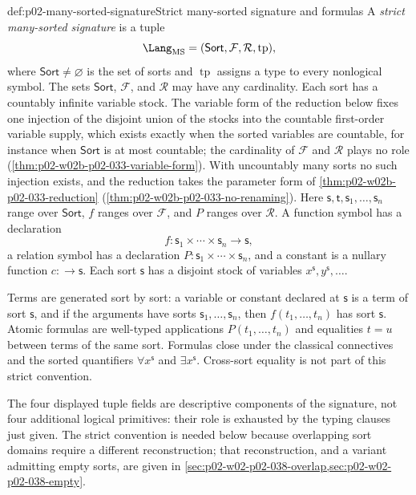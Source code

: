 \begin{hbdefinition}{def:p02-many-sorted-signature}{Strict many-sorted signature and formulas}
A \emph{strict many-sorted signature} is a tuple
\[
 \Lang_{\mathrm{MS}}
   =(\mathsf{Sort},\mathcal F,\mathcal R,\operatorname{tp}),
\]
where \(\mathsf{Sort}\ne\varnothing\) is the set of sorts and
\(\operatorname{tp}\) assigns a type to every nonlogical symbol.  The sets
\(\mathsf{Sort}\), \(\mathcal F\), and \(\mathcal R\) may have any
cardinality.  Each sort has a countably infinite variable stock.  The variable
form of the reduction below fixes one injection of the disjoint union of the
stocks into the countable first-order variable supply, which exists exactly
when the sorted variables are countable, for instance when \(\mathsf{Sort}\)
is at most countable; the cardinality of \(\mathcal F\) and \(\mathcal R\)
plays no role (\cref{thm:p02-w02b-p02-033-variable-form}).  With uncountably
many sorts no such injection exists, and the reduction takes the parameter
form of \cref{thm:p02-w02b-p02-033-reduction}
(\cref{thm:p02-w02b-p02-033-no-renaming}).  Here
\(\mathsf s,\mathsf t,\mathsf s_1,\ldots,\mathsf s_n\) range over
\(\mathsf{Sort}\), \(f\) ranges over
\(\mathcal F\), and \(P\) ranges over \(\mathcal R\).  A function symbol has
a declaration
\[
 f:\mathsf s_1\times\cdots\times\mathsf s_n\longrightarrow\mathsf s,
\]
a relation symbol has a declaration
\(P:\mathsf s_1\times\cdots\times\mathsf s_n\), and a constant is a nullary
function \(c:\longrightarrow\mathsf s\).  Each sort \(\mathsf s\) has a
disjoint stock of variables \(x^{\mathsf s},y^{\mathsf s},\ldots\).

Terms are generated sort by sort: a variable or constant declared at
\(\mathsf s\) is a term of sort \(\mathsf s\), and if the arguments have sorts
\(\mathsf s_1,\ldots,\mathsf s_n\), then \(f(t_1,\ldots,t_n)\) has sort
\(\mathsf s\).  Atomic formulas are well-typed
applications \(P(t_1,\ldots,t_n)\) and equalities \(t=u\) between terms of
the same sort.  Formulas close under the classical connectives and the sorted
quantifiers \(\forall x^{\mathsf s}\) and \(\exists x^{\mathsf s}\).
Cross-sort equality is not part of this strict convention.
\end{hbdefinition}

The four displayed tuple fields are descriptive components of the signature,
not four additional logical primitives: their role is exhausted by the typing
clauses just given.  The strict convention is needed below because overlapping
sort domains require a different reconstruction; that reconstruction, and a
variant admitting empty sorts, are given in
\cref{sec:p02-w02-p02-038-overlap,sec:p02-w02-p02-038-empty}.

